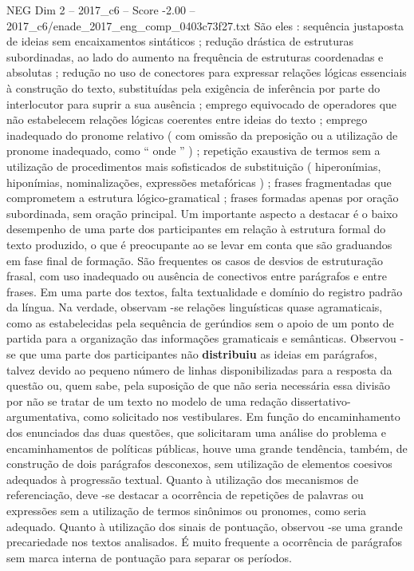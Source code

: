 \begin{textsample}{NEG Dim 2 – 2017\_c6 – Score -2.00 – 2017\_c6/enade\_2017\_eng\_comp\_0403c73f27.txt}
São eles : sequência justaposta de ideias sem encaixamentos sintáticos ; redução drástica de estruturas subordinadas, ao lado do aumento na frequência de estruturas coordenadas e absolutas ; redução no uso de conectores para expressar relações lógicas essenciais à construção do texto, substituídas pela exigência de inferência por parte do interlocutor para suprir a sua ausência ; emprego equivocado de operadores que não estabelecem relações lógicas coerentes entre ideias do texto ; emprego inadequado do pronome relativo ( com omissão da preposição ou a utilização de pronome inadequado, como “ onde ” ) ; repetição exaustiva de termos sem a utilização de procedimentos mais sofisticados de substituição ( hiperonímias, hiponímias, nominalizações, expressões metafóricas ) ; frases fragmentadas que comprometem a estrutura lógico-gramatical ; frases formadas apenas por oração subordinada, sem oração principal.
Um importante aspecto a destacar é o baixo desempenho de uma parte dos participantes em relação à estrutura formal do texto produzido, o que é preocupante ao se levar em conta que são graduandos em fase final de formação.
São frequentes os casos de desvios de estruturação frasal, com uso inadequado ou ausência de conectivos entre parágrafos e entre frases.
Em uma parte dos textos, falta textualidade e domínio do registro padrão da língua.
Na verdade, observam -se relações linguísticas quase agramaticais, como as estabelecidas pela sequência de gerúndios sem o apoio de um ponto de partida para a organização das informações gramaticais e semânticas.
Observou -se que uma parte dos participantes não \textbf{distribuiu} as ideias em parágrafos, talvez devido ao pequeno número de linhas disponibilizadas para a resposta da questão ou, quem sabe, pela suposição de que não seria necessária essa divisão por não se tratar de um texto no modelo de uma redação dissertativo-argumentativa, como solicitado nos vestibulares.
Em função do encaminhamento dos enunciados das duas questões, que solicitaram uma análise do problema e encaminhamentos de políticas públicas, houve uma grande tendência, também, de construção de dois parágrafos desconexos, sem utilização de elementos coesivos adequados à progressão textual.
Quanto à utilização dos mecanismos de referenciação, deve -se destacar a ocorrência de repetições de palavras ou expressões sem a utilização de termos sinônimos ou pronomes, como seria adequado.
Quanto à utilização dos sinais de pontuação, observou -se uma grande precariedade nos textos analisados.
É muito frequente a ocorrência de parágrafos sem marca interna de pontuação para separar os períodos.

\end{textsample}
